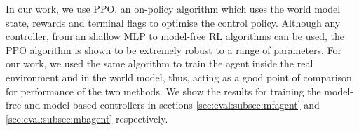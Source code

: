 
In our work, we use PPO, an on-policy algorithm which uses the world model state, rewards and terminal flags to optimise the control policy. Although any controller, from an shallow MLP to model-free RL algorithms can be used, the PPO algorithm is shown to be extremely robust to a range of parameters. For our work, we used the same algorithm to train the agent inside the real environment and in the world model, thus, acting as a good point of comparison for performance of the two methods. We show the results for training the model-free and model-based controllers in sections \ref{sec:eval:subsec:mfagent} and \ref{sec:eval:subsec:mbagent} respectively.

% 